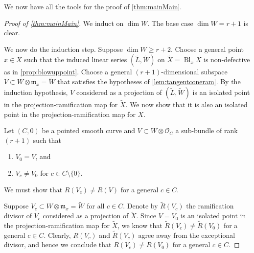 \documentclass[11pt,reqno]{amsart}
\theoremstyle{plain}
\theoremstyle{definition}
\theoremstyle{remark}
\numberwithin{equation}{section}
\DeclareMathOperator{\Bl}{Bl}
\numberwithin{equation}{section}
\renewcommand{\O}{\mathcal O}
\begin{document}
We now have all the tools for the proof of \autoref{thm:mainMain}. 
\begin{proof}[Proof of \autoref{thm:mainMain}]
  We induct on $\dim W$.
  The base case $\dim W = r+1$ is clear.

  We now do the induction step.
  Suppose $\dim W \geq r+2$.
  Choose a general point $x \in X$ such that the induced linear series $(\widetilde L, \widetilde W)$ on $\widetilde X = \Bl_x X$ is non-defective as in \autoref{prop:blowuppoint}.
  Choose a general $(r+1)$-dimensional subspace $V \subset W \otimes \mathfrak m_x = \widetilde W$ that satisfies the hypotheses of \autoref{lem:tangentconeram}.
  By the induction hypothesis, $V$ considered as a projection of $(\widetilde L, \widetilde W)$ is an isolated point in the projection-ramification map for $\widetilde X$.
  We now show that it is also an isolated point in the projection-ramification map for $X$.

  Let $(C, 0)$ be a pointed smooth curve and $V \subset W \otimes \O_C$ a sub-bundle of rank $(r+1)$ such that
  \begin{enumerate}
  \item $V_{0} = V$, and 
  \item $V_{c} \neq V_{0}$ for $c \in C \setminus \{0\}$.
  \end{enumerate}
  We must show that $R(V_c) \neq R(V)$ for a general $c \in C$.

  Suppose $V_c \subset W \otimes \mathfrak m_x = \widetilde W$ for all $c \in C$.
  Denote by $\widetilde R(V_c)$ the ramification divisor of $V_c$ considered as a projection of $\widetilde X$.
  Since $V = V_0$ is an isolated point in the projection-ramification map for $\widetilde X$, we know that $\widetilde R(V_c) \neq \widetilde R(V_0)$ for a general $c \in C$.
  Clearly, $R(V_c)$ and $\widetilde R(V_c)$ agree away from the exceptional divisor, and hence we conclude that $R(V_c) \neq R(V_0)$ for a general $c \in C$.


\end{proof}
\end{document}
